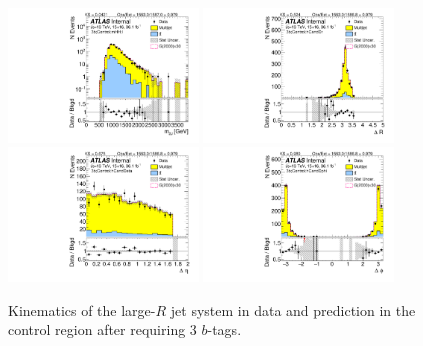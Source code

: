 \begin{figure}[htbp!]
\begin{center}
\includegraphics[angle=270, width=0.45\textwidth]{./figures/boosted/Control/b77_ThreeTag_Control_mHH_l_1.pdf}
\includegraphics[angle=270, width=0.45\textwidth]{./figures/boosted/Control/b77_ThreeTag_Control_hCandDr.pdf}\\
\includegraphics[angle=270, width=0.45\textwidth]{./figures/boosted/Control/b77_ThreeTag_Control_hCandDeta.pdf}
\includegraphics[angle=270, width=0.45\textwidth]{./figures/boosted/Control/b77_ThreeTag_Control_hCandDphi.pdf}
  \caption{Kinematics of the large-$R$ jet system in data and prediction in the control region after requiring 3 $b$-tags.  }
  \label{fig:boosted-3b-control-ak10-system}
\end{center}
\end{figure}

